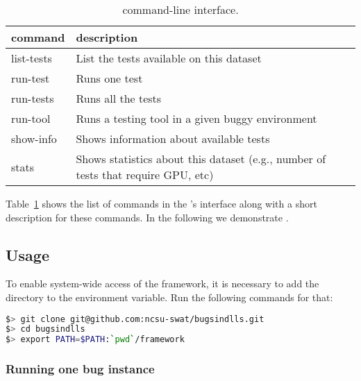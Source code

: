 \documentclass[sigconf,screen]{acmart}
\begin{document}
\begin{table}
  \small
  \centering
  \caption{\label{table:bug-interface}\tname command-line interface.}
  \vspace{-1ex}
\begin{tabular}{lp{6.5cm}}
  \toprule
  \textbf{command} & \textbf{description} \\
  \midrule
list-tests & List the tests available on this dataset\\
run-test & Runs one test\\
run-tests & Runs all the tests\\
run-tool & Runs a testing tool in a given buggy environment \\
show-info & Shows information about available tests\\
stats & Shows statistics about this dataset (e.g., number of tests
that require GPU, etc)\\
\bottomrule
\end{tabular}
  \vspace{-3ex}
\end{table}

Table~\ref{table:bug-interface} shows the list of commands in the
\tname's interface along with a short description for these
commands. In the following we demonstrate \tname.

\vspace{-1ex}
\subsection{Usage}
\label{sec:usage}

To enable system-wide access of the framework, it is necessary to add
the directory  to the  environment
variable. Run the following commands for that:

\begin{lstlisting}[language=bash,basicstyle=\small,]
$> git clone git@github.com:ncsu-swat/bugsindlls.git
$> cd bugsindlls
$> export PATH=$PATH:`pwd`/framework
\end{lstlisting}


\subsubsection{Running one bug instance}
\end{document}
